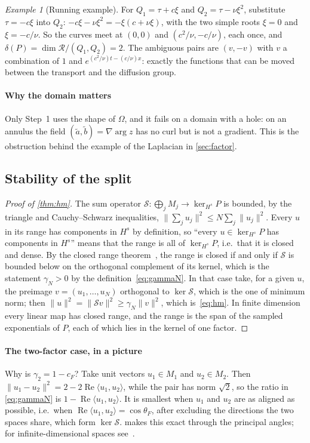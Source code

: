 \documentclass[11pt]{article}
\theoremstyle{plain}
\theoremstyle{definition}
\theoremstyle{remark}
\newtheorem{example}[theorem]{Example}
\newcommand{\ring}{\mathcal{R}}            %
\newcommand{\sumop}{\mathcal{S}}            %
\newcommand{\cF}{c_{F}}                     %
\newcommand{\thetaF}{\theta_{F}}            %
\newcommand{\gN}{\gamma_{N}}                %
\newcommand{\deltaP}{\delta(P)}             %
\newcommand{\Hs}{H^{s}}                     %
\newcommand{\norm}[1]{\lVert#1\rVert}
\newcommand{\ip}[2]{\langle#1,#2\rangle}
\begin{document}
\begin{example}[Running example]\label{sm:ex:delta}
For $Q_1=\tau+c\xi$ and $Q_2=\tau-\nu\xi^2$, substitute $\tau=-c\xi$ into $Q_2$: $-c\xi-\nu\xi^2=-\xi(c+\nu\xi)$, with the two
simple roots $\xi=0$ and $\xi=-c/\nu$. So the curves meet at $(0,0)$ and $(c^2/\nu,-c/\nu)$, each once, and
$\deltaP=\dim\ring/(Q_1,Q_2)=2$. The ambiguous pairs are $(v,-v)$ with $v$ a combination of $1$ and
$e^{(c^2/\nu)t-(c/\nu)x}$: exactly the functions that can be moved between the transport and the diffusion group.
\end{example}

\paragraph{Why the domain matters} Only Step~1 uses the shape of $\Omega$, and it fails on a domain with a hole: on an
annulus the field $(\tilde a,\tilde b)=\nabla\arg z$ has no curl but is not a gradient. This is the obstruction behind the
example of the Laplacian in \cref{sec:factor}.

\subsection{Stability of the split}\label{sm:proof-hm}
\begin{proof}[Proof of \cref{thm:hm}]
The sum operator $\sumop:\bigoplus_jM_j\to\ker_{\Hs}P$ is bounded, by the triangle and Cauchy--Schwarz inequalities,
$\norm{\sum_ju_j}^2\le N\sum_j\norm{u_j}^2$. Every $u$ in its range has components in $\Hs$ by definition, so ``every
$u\in\ker_{\Hs}P$ has components in $\Hs$'' means that the range is all of $\ker_{\Hs}P$, i.e.\ that it is closed and
dense. By the closed range theorem~\cite[Thm.~2.21]{Bre11}, the range is closed if and only if $\sumop$ is bounded below on
the orthogonal complement of its kernel, which is the statement $\gN>0$ by the definition~\eqref{eq:gammaN}. In that
case take, for a given $u$, the preimage $v=(u_1,\dots,u_N)$ orthogonal to $\ker\sumop$, which is the one of minimum norm;
then $\norm{u}^2=\norm{\sumop v}^2\ge\gN\norm{v}^2$, which is~\eqref{eq:hm}. In finite dimension every linear map has
closed range, and the range is the span of the sampled exponentials of $P$, each of which lies in the kernel of one
factor.
\end{proof}

\paragraph{The two-factor case, in a picture} Why is $\gamma_2=1-\cF$? Take unit vectors $u_1\in M_1$ and $u_2\in M_2$.
Then $\norm{u_1-u_2}^2=2-2\operatorname{Re}\ip{u_1}{u_2}$, while the pair has norm $\sqrt2$, so the ratio in
\eqref{eq:gammaN} is $1-\operatorname{Re}\ip{u_1}{u_2}$. It is smallest when $u_1$ and $u_2$ are as aligned as possible,
i.e.\ when $\operatorname{Re}\ip{u_1}{u_2}=\cos\thetaF$, after excluding the directions the two spaces share, which form
$\ker\sumop$.  makes this exact through the principal angles; for infinite-dimensional spaces
see~\cite[Ch.~9]{Deu01}.
\end{document}
